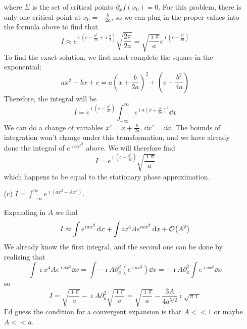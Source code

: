 \documentclass[a4paper,twoside]{article}
\begin{document}
\begin{itemize}
\begin{problem}
\begin{equation}
            \end{equation}
            where $ \Sigma $ is the set of critical points $ \partial_x f(x_0) = 0 $. For this problem, there is only one critical point at $ x_0 = - \frac{b}{2a} $, so we can plug in the proper values into the formula above to find that
            \begin{equation}
                I \approx e^{\imath \left( c - \frac{b^2}{4a} + \imath \frac{\pi}{4} \right)} \sqrt{\frac{2 \pi}{2a}} = \sqrt{\frac{\imath \pi}{a}} e^{\imath \left( c - \frac{b^2}{4a} \right)}
            \end{equation}
            To find the exact solution, we first must complete the square in the exponential:
            \begin{equation}
                a x^2 + b x + c = a\left( x + \frac{b}{2a} \right)^2 + \left( c - \frac{b^2}{4a} \right)
            \end{equation}
            Therefore, the integral will be
            \begin{equation}
                I = e^{\imath \left(c - \frac{b^2}{4a}\right)} \int_{- \infty}^{\infty} e^{\imath a \left( x + \frac{b}{2a} \right)^2} \dd{x}
            \end{equation}
            We can do a change of variables $ x' = x + \frac{b}{2a} $, $ \dd{x'} = \dd{x} $. The bounds of integration won't change under this transformation, and we have already done the integral of $ e^{\imath a x'^2} $ above. We will therefore find
            \begin{equation}
                I = e^{\imath \left( c - \frac{b^2}{4a} \right)} \sqrt{\frac{\imath \pi}{a}}
            \end{equation}
            which happens to be equal to the stationary phase approximation.
        \end{problem}
    \item[(c)] $ I = \int_{- \infty}^{\infty} e^{\imath (ax^2 + A x^4)} $.
        \begin{problem}
            Expanding in $ A $ we find
            \begin{equation}
                I \approx \int e^{\imath a x^2} \dd{x} + \int \imath x^4 A e^{\imath a x^2} \dd{x} + \order{A^2}
            \end{equation}
            We already know the first integral, and the second one can be done by realizing that
            \begin{equation}
                \int \imath x^4 A e^{\imath a x^2} \dd{x} = \int - \imath A \partial_a^2 \left( e^{\imath a x^2} \right) \dd{x} = - \imath A \partial^2_a \int e^{\imath a x^2} \dd{x}
            \end{equation}
            so
            \begin{equation}
                I = \sqrt{\frac{\imath \pi}{a}} - \imath A \partial^2_a \sqrt{\frac{\imath \pi}{a}} = \sqrt{\frac{\imath \pi}{a}} - \frac{3A}{4a^{5/2}} \imath\sqrt{\pi \imath}
            \end{equation}
            I'd guess the condition for a convergent expansion is that $ A << 1 $ or maybe $ A << a $.


\end{problem}
\end{itemize}
\end{document}
